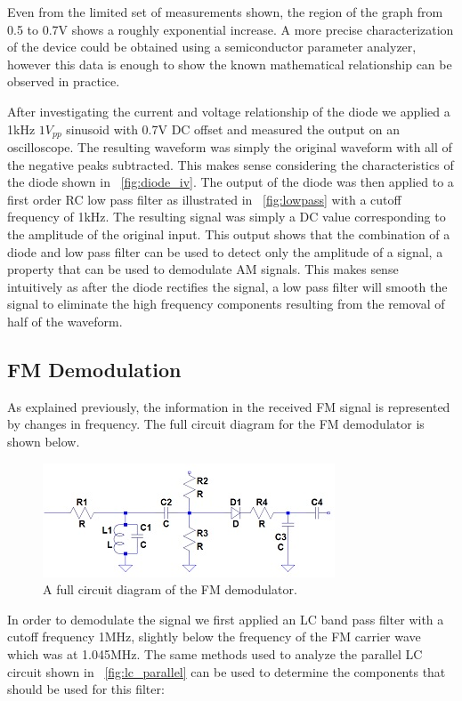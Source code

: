\documentclass[11pt]{article}
\begin{document}
  Even from the limited set of measurements shown, the region of the graph from 0.5 to 0.7V shows a roughly exponential increase. A more precise characterization of the device could be obtained using a semiconductor parameter analyzer, however this data is enough to show the known mathematical relationship can be observed in practice.     
  
  After investigating the current and voltage relationship of the diode we applied a 1kHz $1V_{pp}$ sinusoid with 0.7V DC offset and measured the output on an oscilloscope.  The resulting waveform was simply the original waveform with all of the negative peaks subtracted. This makes sense considering the characteristics of the diode shown in ~\ref{fig:diode_iv}.
  The output of the diode was then applied to a first order RC low pass filter as illustrated in ~\ref{fig:lowpass} with a cutoff frequency of 1kHz. The resulting signal was simply a DC value corresponding to the amplitude of the original input. This output shows that the combination of a diode and low pass filter can be used to detect only the amplitude of a signal, a property that can be used to demodulate AM signals. This makes sense intuitively as after the diode rectifies the signal, a low pass filter will smooth the signal to eliminate the high frequency components resulting from the removal of half of the waveform.
  
  \subsection{FM Demodulation}
  As explained previously, the information in the received FM signal is represented by changes in frequency. The full circuit diagram for the FM demodulator is shown below.
    \begin{figure}[h!]
    \centering
    \includegraphics[scale=1.7]{demodulator.jpg}
    \caption{A full circuit diagram of the FM demodulator.}
    \label{fig:demodulator}
    \end{figure}
    
  In order to demodulate the signal we first applied an LC band pass filter with a cutoff frequency 1MHz, slightly below the frequency of the FM carrier wave which was at 1.045MHz.  The same methods used to analyze the parallel LC circuit shown in ~\ref{fig:lc_parallel} can be used to determine the components that should be used for this filter:
  
\end{document}
